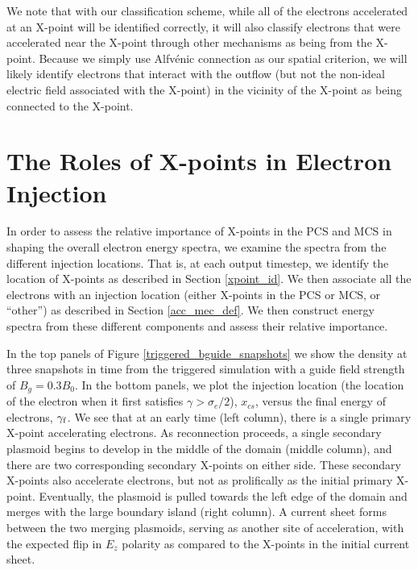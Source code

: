 We note that with our classification scheme, while all of the electrons accelerated at an X-point will be identified correctly, it will also classify electrons that were accelerated near the X-point through other mechanisms as being from the X-point.  Because we simply use Alfv\'enic connection as our spatial criterion, we will likely identify electrons that interact with the outflow (but not the non-ideal electric field associated with the X-point) in the vicinity of the X-point as being connected to the X-point. 

\section{The Roles of X-points  in Electron Injection}\label{role_of_xpoint}
In order to assess the relative importance of X-points in the PCS and MCS in shaping the overall electron energy spectra, we examine the spectra from the different injection locations.  That is, at each output timestep, we identify the location of X-points as described in Section \ref{xpoint_id}.  We then associate all the electrons with an injection location (either X-points in the PCS or MCS, or ``other'') as described in Section \ref{acc_mec_def}.  We then construct energy spectra from these different components and assess their relative importance.

In the top panels of  Figure \ref{triggered_bguide_snapshots} we show the density at three snapshots in time from the triggered simulation with a guide field strength of $B_{g}=0.3B_{0}$.  In the bottom panels, we plot the injection location (the location of the electron when it first satisfies $\gamma > \sigma_{e}/2$), $x_{cs}$, versus the final energy of electrons, $\gamma_{\rm{f}}$.  We see that at an early time (left column), there is a single primary X-point accelerating electrons.  As reconnection proceeds, a single secondary plasmoid begins to develop in the middle of the domain (middle column), and there are two corresponding secondary X-points on either side.  These secondary X-points also accelerate electrons, but not as prolifically as the initial primary X-point.  Eventually, the plasmoid is pulled towards the left edge of the domain  and merges with the large boundary island (right column).  A current sheet forms between the two merging plasmoids, serving as another site of acceleration, with the expected flip in $E_{z}$ polarity as compared to the X-points in the initial current sheet.  


